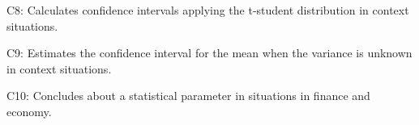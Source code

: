 

	
	\begin{ExamCriteria}
		\item C8: Calculates confidence intervals applying the t-student distribution in context situations.
		\item C9: Estimates the confidence interval for the mean when the variance is unknown in context situations.
		\item C10: Concludes about a statistical parameter in situations in finance and economy.
	\end{ExamCriteria}

